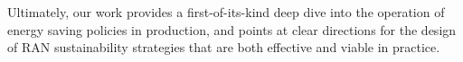 


Ultimately, our work provides a first-of-its-kind deep dive into the operation of energy saving policies in production, and points at clear directions for the design of RAN sustainability strategies that are both effective and viable in practice.
